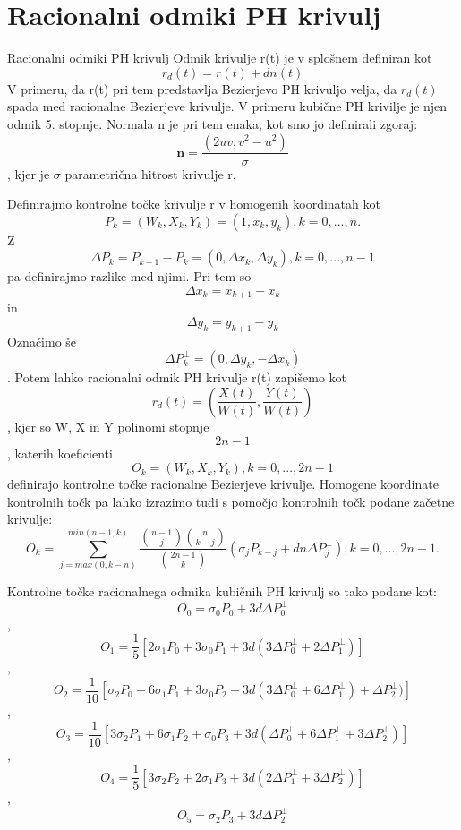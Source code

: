 \documentclass[12pt]{article}
\begin{document}
\section*{Racionalni odmiki PH krivulj}
Racionalni odmiki PH krivulj
Odmik krivulje r(t) je v splošnem definiran kot
$$ r_d(t) = r(t) + dn(t)$$
V primeru, da r(t) pri tem predstavlja Bezierjevo PH krivuljo velja, 
da $r_d(t)$ spada med racionalne Bezierjeve krivulje. V primeru kubične PH krivilje 
je njen odmik 5. stopnje. Normala n je pri tem enaka, kot smo jo definirali zgoraj:
$$\textbf{n} =\frac{(2uv, v^2 - u^2)}{\sigma}$$,
kjer je $\sigma$ parametrična hitrost krivulje r.

Definirajmo kontrolne točke krivulje r v homogenih koordinatah kot
$$ P_k = (W_k, X_k, Y_k) = (1, x_k, y_k), k = 0, ..., n.$$
Z $$\Delta P_k = P_{k+1}-P_k = (0, \Delta x_k, \Delta y_k), k = 0, ..., n-1$$ 
pa definirajmo razlike med njimi. Pri tem so $$\Delta x_k = x_{k+1} - x_k$$ in $$\Delta y_k = y_{k+1} - y_k$$
Označimo še $$ \Delta P_k^{\perp} = (0, \Delta y_k, - \Delta x_k)$$. Potem lahko
racionalni odmik PH krivulje r(t) zapišemo kot
$$ r_d(t) = (\frac{X(t)}{W(t)}, \frac{Y(t)}{W(t)})$$,
kjer so W, X in Y polinomi stopnje $$2n -1$$, katerih koeficienti 
$$ O_k = (W_k, X_k, Y_k), k = 0, ..., 2n-1$$
definirajo kontrolne točke racionalne Bezierjeve krivulje. 
Homogene koordinate kontrolnih točk pa lahko izrazimo tudi s pomočjo kontrolnih točk podane začetne krivulje:
$$ O_k = \sum_{j=max(0,k-n)}^{min(n-1,k)}{\frac{\binom{n-1}{j}\binom{n}{k-j}}{\binom{2n-1}{k}}(\sigma_j P_{k-j}+d n \Delta P^{\perp}_{j})}, k = 0, ..., 2n-1.$$

Kontrolne točke racionalnega odmika kubičnih PH krivulj so tako podane kot:
$$ O_0 = \sigma_0 P_0 + 3 d \Delta P_0^{\perp}$$,
$$ O_1 = \frac{1}{5} [2 \sigma_1 P_0 + 3\sigma_0 P_1 + 3 d (3 \Delta P_0^{\perp} + 2 \Delta P_1^{\perp})]$$,
$$ O_2 = \frac{1}{10} [\sigma_2 P_0 + 6\sigma_1 P_1 + 3\sigma_0 P_2 + 3 d (3 \Delta P_0^{\perp} + 6 \Delta P_1^{\perp}) + \Delta P_2^{\perp})]$$,
$$ O_3 = \frac{1}{10} [3\sigma_2 P_1 + 6\sigma_1 P_2 + \sigma_0 P_3 + 3 d (\Delta P_0^{\perp} + 6 \Delta P_1^{\perp} + 3 \Delta P_2^{\perp})]$$,
$$ O_4 = \frac{1}{5} [3\sigma_2 P_2 + 2\sigma_1 P_3 + 3 d (2\Delta P_1^{\perp} + 3 \Delta P_2^{\perp})]$$,
$$ O_5 = \sigma_2 P_3 + 3 d \Delta P_2^{\perp}$$
\end{document}
